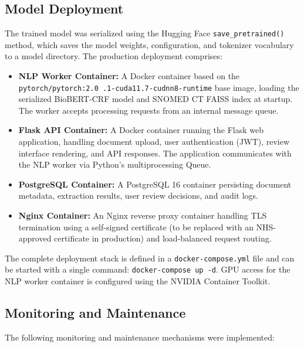 \subsection{Model Deployment}
The trained model was serialized using the Hugging Face \texttt{save\_pretrained()} method, which saves the model weights, configuration, and tokenizer vocabulary to a model directory. The production deployment comprises:
\begin{itemize}
    \item \textbf{NLP Worker Container:} A Docker container based on the \texttt{pytorch/pytorch:2.0 \allowbreak .1-cuda11.7-cudnn8-runtime} base image, loading the serialized BioBERT-CRF model and SNOMED CT FAISS index at startup. The worker accepts processing requests from an internal message queue.
    \item \textbf{Flask API Container:} A Docker container running the Flask web application, handling document upload, user authentication (JWT), review interface rendering, and API responses. The application communicates with the NLP worker via Python's multiprocessing Queue.
    \item \textbf{PostgreSQL Container:} A PostgreSQL 16 container persisting document metadata, extraction results, user review decisions, and audit logs.
    \item \textbf{Nginx Container:} An Nginx reverse proxy container handling TLS termination using a self-signed certificate (to be replaced with an NHS-approved certificate in production) and load-balanced request routing.
\end{itemize}

The complete deployment stack is defined in a \texttt{docker-compose.yml} file and can be started with a single command: \texttt{docker-compose up -d}. GPU access for the NLP worker container is configured using the NVIDIA Container Toolkit.

\subsection{Monitoring and Maintenance}

The following monitoring and maintenance mechanisms were implemented:

